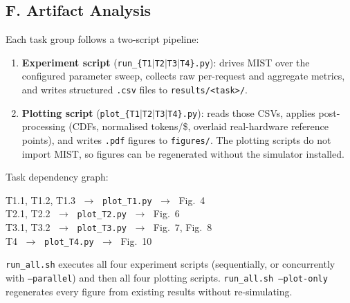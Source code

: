 \documentclass[conference]{IEEEtran}
\newcommand{\tool}{{MIST }}
\newcommand{\toolns}{{MIST}}
\begin{document}
\subsection*{F. Artifact Analysis}

Each task group follows a two-script pipeline:

\begin{enumerate}[leftmargin=1.2em]
  \item \textbf{Experiment script}
        (\texttt{run\_\{T1$|$T2$|$T3$|$T4\}.py}):
        drives \tool over the configured parameter sweep, collects raw
        per-request and aggregate metrics, and writes structured
        \texttt{.csv} files to \texttt{results/<task>/}.
  \item \textbf{Plotting script}
        (\texttt{plot\_\{T1$|$T2$|$T3$|$T4\}.py}):
        reads those CSVs, applies post-processing (CDFs, normalised
        tokens/\$, overlaid real-hardware reference points), and writes
        \texttt{.pdf} figures to \texttt{figures/}.
        The plotting scripts do not import \toolns, so figures can be
        regenerated without the simulator installed.
\end{enumerate}

\noindent Task dependency graph:

\begin{center}
  T1.1, T1.2, T1.3 $\;\rightarrow\;$ \texttt{plot\_T1.py}
    $\;\rightarrow\;$ Fig.~4 \\[3pt]
  T2.1, T2.2 $\;\rightarrow\;$ \texttt{plot\_T2.py}
    $\;\rightarrow\;$ Fig.~6 \\[3pt]
  T3.1, T3.2 $\;\rightarrow\;$ \texttt{plot\_T3.py}
    $\;\rightarrow\;$ Fig.~7, Fig.~8 \\[3pt]
  T4 $\;\rightarrow\;$ \texttt{plot\_T4.py}
    $\;\rightarrow\;$ Fig.~10
\end{center}

\noindent \texttt{run\_all.sh} executes all four experiment scripts
(sequentially, or concurrently with \texttt{--parallel}) and then all
four plotting scripts.  \texttt{run\_all.sh --plot-only} regenerates
every figure from existing results without re-simulating.
\end{document}
